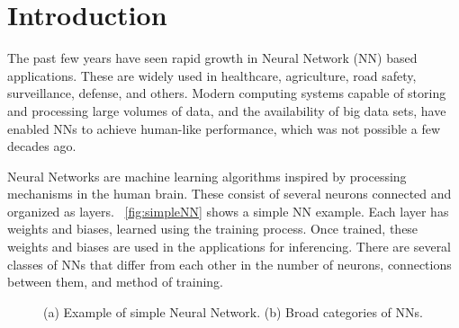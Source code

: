 \documentclass[a4paper,10pt]{article}
\begin{document}

\newpage
\setcounter{tocdepth}{2}
\tableofcontents
\newpage

\section{Introduction}
The past few years have seen rapid growth in Neural Network (NN) based applications. These are widely used in healthcare, agriculture, road safety, surveillance, defense, and others. Modern computing systems capable of storing and processing large volumes of data, and the availability of big data sets, have enabled NNs to achieve human-like performance, which was not possible a few decades ago.

Neural Networks are machine learning algorithms inspired by processing mechanisms in the human brain. These consist of several neurons connected and organized as layers. \figurename{~\ref{fig:simpleNN}} shows a simple NN example. Each layer has weights and biases, learned using the training process. Once trained, these weights and biases are used in the applications for inferencing. There are several classes of NNs that differ from each other in the number of neurons, connections between them, and method of training. 
\begin{figure}[!htb]
	\centering
    \captionsetup{font=sf}
	\hfil
	\hfil
	\caption{(a) Example of simple Neural Network. (b) Broad categories of NNs.}
	\label{fig:intro}
\end{figure}
\end{document}
